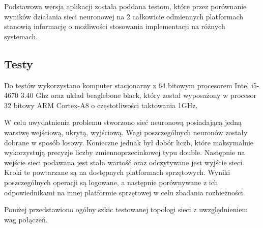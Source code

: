 Podstawowa wersja aplikacji została poddana testom, które przez porównanie wyników działania sieci neuronowej na 2 całkowicie odmiennych platformach stanowią informację o możliwości stosowania implementacji na różnych systemach.
 
\subsection{Testy}
Do testów wykorzystano komputer stacjonarny z 64 bitowym procesorem Intel i5-4670 3.40 Ghz oraz układ beaglebone black, który został wyposażony w procesor 32 bitowy ARM Cortex-A8 o częstotliwości taktowania 1GHz.

W celu uwydatnienia problemu stworzono sieć neuronową posiadającą jedną  warstwę wejściową, ukrytą, wyjściową. Wagi poszczególnych neuronów zostały dobrane w sposób losowy. Konieczne jednak był dobór liczb, które maksymalnie wykorzystują precyzje liczby zmiennoprzecinkowej typu double. Następnie na wejście sieci podawana jest stała wartość oraz odczytywane jest wyjście sieci. Kroki te powtarzane są na  dostępnych platformach sprzętowych. Wyniki poszczególnych operacji są logowane, a następnie porównywane z ich odpowiednikami na innej platformie sprzętowej w celu zbadania rozbieżności.

Poniżej przedstawiono ogólny szkic testowanej topologi sieci z uwzględnieniem wag połączeń.


